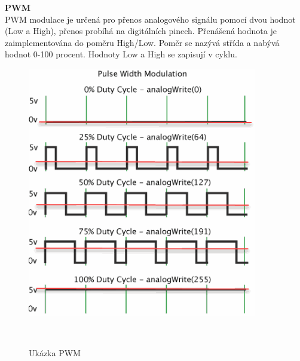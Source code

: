 \textbf{PWM}\\
PWM modulace je určená pro přenos analogového signálu pomocí dvou hodnot (Low a High), přenos probíhá na digitálních pinech. Přenášená hodnota je zaimplementována do poměru High/Low. Poměr se nazývá střída a nabývá hodnot 0-100 procent. Hodnoty Low a High se zapisují v cyklu.\cite{pwmwiki}\\


\begin{figure}[H]
	\centering
	\includegraphics[width=10cm]{pictures/pwm.png}
	\caption{Ukázka PWM}
	\cite{pwm}\\
\end{figure}



